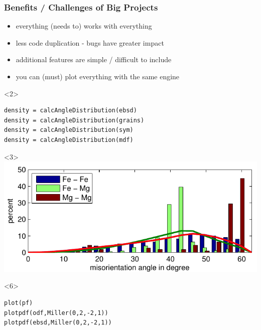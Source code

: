 \documentclass[comptress]{beamer}
\begin{document}
\begin{frame}[fragile]
  \frametitle{Benefits / Challenges of Big Projects}

  \begin{overlayarea}{\textwidth}{2.5cm}
  \begin{itemize}
    \item<2-> everything (needs to) works with everything
    \item<4-> less code duplication - bugs have greater impact
    \item<5-> additional features are simple / difficult to include
    \item<6-> you can (must) plot everything with the same engine
  \end{itemize}
\end{overlayarea}
\begin{overlayarea}{\textwidth}{5.5cm}
  \begin{onlyenv}<2>
    \begin{lstlisting}
density = calcAngleDistribution(ebsd)
density = calcAngleDistribution(grains)
density = calcAngleDistribution(sym)
density = calcAngleDistribution(mdf)
    \end{lstlisting}
  \end{onlyenv}
  \begin{onlyenv}<3>
    \includegraphics[width=\textwidth]{pic/misori}
  \end{onlyenv}
  \begin{onlyenv}<6>
    \vspace{-0.3cm}
  \begin{lstlisting}[sytle=input]
plot(pf)
plotpdf(odf,Miller(0,2,-2,1))
plotpdf(ebsd,Miller(0,2,-2,1))
  \end{lstlisting}


\end{onlyenv}
\end{overlayarea}
\end{frame}
\end{document}
